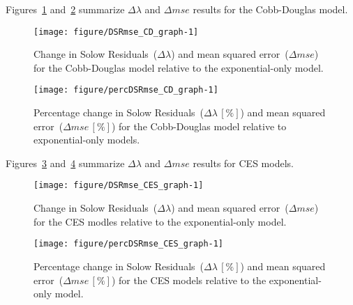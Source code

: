 \documentclass[preprint,authoryear,12pt]{elsarticle}\usepackage[]{graphicx}\usepackage[]{color}
\makeatletter
\def\maxwidth{ %
  \ifdim\Gin@nat@width>\linewidth
    \linewidth
  \else
    \Gin@nat@width
  \fi
}
\newenvironment{knitrout}{}{} %
\makeatother
\begin{document}
%
Figures~\ref{fig:DSRmse_CD_graph} and~\ref{fig:percDSRmse_CD_graph} summarize 
$\Delta \lambda$ and $\Delta mse$ 
results for the Cobb-Douglas model.
%
\begin{knitrout}
\color{fgcolor}\begin{figure}[H]

{\centering \texttt{[image: figure/DSRmse\_CD\_graph-1]} 

}

\caption[Change in Solow Residuals~(]{Change in Solow Residuals~($\Delta\lambda$) and mean squared error~($\Delta mse$) for the Cobb-Douglas model relative to the exponential-only model.}\label{fig:DSRmse_CD_graph}
\end{figure}


\end{knitrout}
%
\begin{knitrout}
\color{fgcolor}\begin{figure}[H]

{\centering \texttt{[image: figure/percDSRmse\_CD\_graph-1]} 

}

\caption[Percentage change in Solow Residuals~(]{Percentage change in Solow Residuals~($\Delta\lambda \, [\%]$) and mean squared error~($\Delta mse \, [\%]$) for the Cobb-Douglas model relative to exponential-only models.}\label{fig:percDSRmse_CD_graph}
\end{figure}


\end{knitrout}
%
Figures~\ref{fig:DSRmse_CES_graph} and~\ref{fig:percDSRmse_CES_graph} summarize 
$\Delta \lambda$ and $\Delta mse$ 
results for CES models.
%
\begin{knitrout}
\color{fgcolor}\begin{figure}[H]

{\centering \texttt{[image: figure/DSRmse\_CES\_graph-1]} 

}

\caption[Change in Solow Residuals~(]{Change in Solow Residuals~($\Delta\lambda$) and mean squared error~($\Delta mse$) for the CES modles relative to the exponential-only model.}\label{fig:DSRmse_CES_graph}
\end{figure}


\end{knitrout}
%
\begin{knitrout}
\color{fgcolor}\begin{figure}[H]

{\centering \texttt{[image: figure/percDSRmse\_CES\_graph-1]} 

}

\caption[Percentage change in Solow Residuals~(]{Percentage change in Solow Residuals~($\Delta\lambda \, [\%]$) and mean squared error~($\Delta mse \, [\%]$) for the CES models relative to the exponential-only model.}\label{fig:percDSRmse_CES_graph}
\end{figure}


\end{knitrout}
\end{document}
